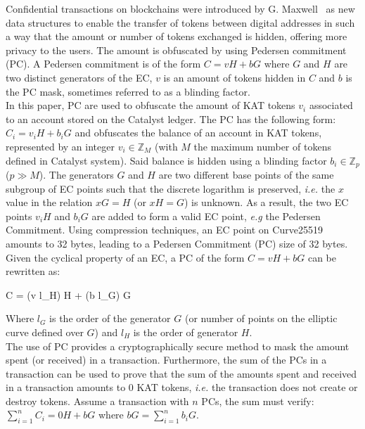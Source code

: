 Confidential transactions on blockchains were introduced by G. Maxwell~\cite{confidential} as new data structures to enable the transfer of tokens between digital addresses in such a way that the amount or number of tokens exchanged is hidden, offering more privacy to the users. The amount is obfuscated by using Pedersen commitment (PC). A Pedersen commitment is of the form $C = vH + bG$ where $G$ and $H$ are two distinct generators of the EC, $v$ is an amount of tokens hidden in $C$ and $b$ is the PC mask, sometimes referred to as a blinding factor.\\

In this paper, PC are used to obfuscate the amount of KAT tokens $v_{i}$ associated to an account stored on the Catalyst ledger. The PC has the following form: $C_{i} = v_{i}H + b_{i}G$ and obfuscates the balance of an account in KAT tokens, represented by an integer $v_{i} \in \mathbb{Z}_M$ (with $M$ the maximum number of tokens defined in Catalyst system). Said balance is hidden using a blinding factor $b_{i} \in \mathbb{Z}_p$ ($p \gg M$). The generators $G$ and $H$ are two different base points of the same subgroup of EC points such that the discrete logarithm is preserved, \textit{i.e.} the $x$ value in the relation $xG = H$ (or $xH = G$) is unknown. As a result, the two EC points $v_{i}H$ and $b_{i}G$ are added to form a valid EC point, \textit{e.g} the Pedersen Commitment. Using compression techniques, an EC point on Curve25519 amounts to 32 bytes, leading to a Pedersen Commitment (PC) size of 32 bytes.\\

Given the cyclical property of an EC, a PC of the form $C = vH + bG$ can be rewritten as:
\begin{center}
C = (v  l_H) H + (b  l_G) G
\end{center}
Where $l_G$ is the order of the generator $G$ (or number of points on the elliptic curve defined over $G$) and $l_H$ is the order of generator $H$.\\ 


The use of PC provides a cryptographically secure method to mask the amount spent (or received) in a transaction. Furthermore, the sum of the PCs in a transaction can be used to prove that the sum of the amounts spent and received in a transaction amounts to 0 KAT tokens, \textit{i.e.} the transaction does not create or destroy tokens. Assume a transaction with $n$ PCs, the sum must verify: $\sum_{i=1}^n C_i = 0H + bG$ where $bG = \sum_{i=1}^n b_iG$. \\

